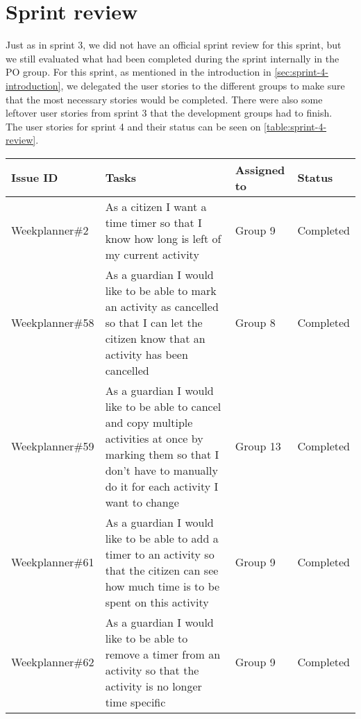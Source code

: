 \section{Sprint review}
Just as in sprint 3, we did not have an official sprint review for this sprint, but we still evaluated what had been completed during the sprint internally in the PO group.
For this sprint, as mentioned in the introduction in \autoref{sec:sprint-4-introduction}, we delegated the user stories to the different groups to make sure that the most necessary stories would be completed. There were also some leftover user stories from sprint 3 that the development groups had to finish.
\\
The user stories for sprint 4 and their status can be seen on \autoref{table:sprint-4-review}.
\begin{longtable}{|p{2.9cm}|p{8cm}|p{2cm}|p{2cm}|}
    \hline
    Issue ID        & Tasks                                                                                                                                                                                    & Assigned to  & Status   \\ \hline
    Weekplanner\#2 & As a citizen I want a time timer so that I know how long is left of my current activity                                                                                                   & Group 9      & Completed  \\ \hline
    Weekplanner\#58 & As a guardian I would like to be able to mark an activity as cancelled so that I can let the citizen know that an activity has been cancelled                                            & Group 8      & Completed   \\ \hline
    Weekplanner\#59 & As a guardian I would like to be able to cancel and copy multiple activities at once by marking them so that I don't have to manually do it for each activity I want to change           & Group 13     & Completed   \\ \hline
    Weekplanner\#61 & As a guardian I would like to be able to add a timer to an activity so that the citizen can see how much time is to be spent on this activity                                            & Group 9      & Completed    \\ \hline
    Weekplanner\#62 & As a guardian I would like to be able to remove a timer from an activity so that the activity is no longer time specific                                                                 & Group 9      & Completed    \\ \hline

\end{longtable}

